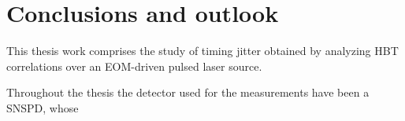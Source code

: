 \chapter{Conclusions and outlook}
\label{Capitolo5}


This thesis work comprises the study of timing jitter obtained by analyzing HBT correlations over an EOM-driven pulsed laser source.

Throughout the thesis the detector used for the measurements have been a SNSPD, whose



\begin{comment}
Cosa è necessario dire in questa parte ?!?!?!?!?

Parte 1 : Descrizione sintetica di cosa è stato raggiunto in questo lavoro ( COUPLE OF SENTENCES PER PART OF THESIS )

Parte EOM :
- discovered a new method to identify the central peak in the HBT correlations of a pulsed light source. 
		How we've been able to deliver this ? analyzing every peak with an automated script, and making considerations towards the width of these 
			peaks!!
- Observed that the jitter of the FPGA gets worse over longer shifts

Parte femtoseconds : Optimizing TCSPC and HBT measurements of a fs laser source !

- analyzed a poor measurement to understand if the math can explain some of the undesired mess happening.
		- went back to the theory and retrieved the time coordinates of the peaks of the HBT histograms, using the coordinates of the peaks detecte
			in the two TCSPC measurements.
			
- understood that refined thresholds concur to the achievement of better measurements, even though it is not fully resolutive as a solution.


Parte 2 : 

PARTE 2 : MAIN RESULTS OBTAINED IN THIS WORK

Parte EOM :
- discovered a new method to identify the central peak in the HBT correlations of a pulsed light source. 
		How we've been able to deliver this ? analyzing every peak with an automated script, and making considerations towards the width of these 
			peaks!!
- Observed that the jitter of the FPGA gets worse over longer shifts

Parte femtoseconds : Optimizing TCSPC and HBT measurements of a fs laser source !

- analyzed a poor measurement to understand if the math can explain some of the undesired mess happening.
		- went back to the theory and retrieved the time coordinates of the peaks of the HBT histograms, using the coordinates of the peaks detecte
			in the two TCSPC measurements.
			
- understood that refined thresholds concur to the achievement of better measurements, even though it is not fully resolutive as a solution.


%

Parte 4 : further developments to this work
\end{comment}